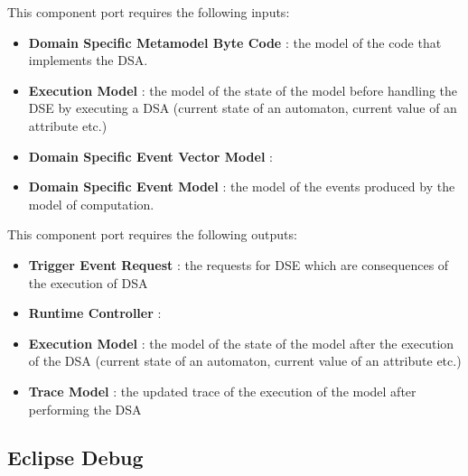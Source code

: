 \documentclass{gemoc} %
\begin{document}
This component port requires the following inputs:
\begin{itemize}
  \item \textbf{Domain Specific Metamodel Byte Code} :
the model of the code that implements the DSA.
  \item \textbf{Execution Model} :
the model of the state of the model before handling the DSE by executing a DSA (current state of an automaton, current value of an attribute etc.)
  \item \textbf{Domain Specific Event Vector Model} :
  \item \textbf{Domain Specific Event Model} :
the model of the events produced by the model of computation.
\end{itemize}

This component port requires the following outputs:
\begin{itemize}
  \item \textbf{Trigger Event Request} :
the requests for DSE which are consequences of the execution of DSA
  \item \textbf{Runtime Controller} :
  \item \textbf{Execution Model} :
the model of the state of the model after the execution of the DSA (current state of an automaton, current value of an attribute etc.)
  \item \textbf{Trace Model} :
the updated trace of the execution of the model after performing the DSA
\end{itemize}

\subsection{Eclipse Debug}
\end{document}
